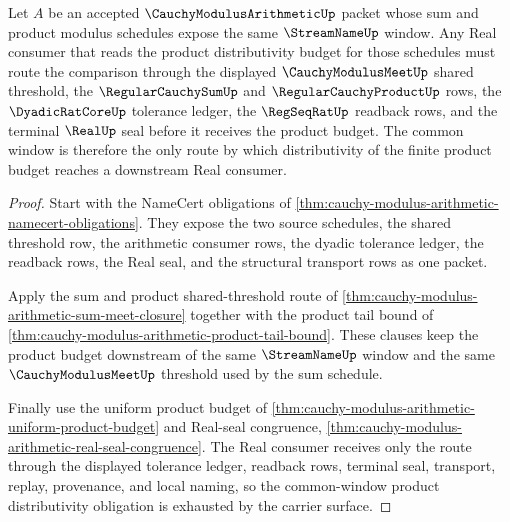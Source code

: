 \begin{theorem}
\label{thm:cauchy-modulus-arithmetic-windowed-product-distributivity}
Let $A$ be an accepted $\CauchyModulusArithmeticUp$ packet whose sum and
product modulus schedules expose the same $\StreamNameUp$ window. Any Real
consumer that reads the product distributivity budget for those schedules must
route the comparison through the displayed $\CauchyModulusMeetUp$ shared
threshold, the $\RegularCauchySumUp$ and $\RegularCauchyProductUp$ rows, the
$\DyadicRatCoreUp$ tolerance ledger, the $\RegSeqRatUp$ readback rows, and the
terminal $\RealUp$ seal before it receives the product budget. The common
window is therefore the only route by which distributivity of the finite
product budget reaches a downstream Real consumer.
\end{theorem}
\begin{proof}
Start with the NameCert obligations of
\autoref{thm:cauchy-modulus-arithmetic-namecert-obligations}. They expose the
two source schedules, the shared threshold row, the arithmetic consumer rows,
the dyadic tolerance ledger, the readback rows, the Real seal, and the
structural transport rows as one packet.

Apply the sum and product shared-threshold route of
\autoref{thm:cauchy-modulus-arithmetic-sum-meet-closure} together with the
product tail bound of
\autoref{thm:cauchy-modulus-arithmetic-product-tail-bound}. These clauses keep
the product budget downstream of the same $\StreamNameUp$ window and the same
$\CauchyModulusMeetUp$ threshold used by the sum schedule.

Finally use the uniform product budget of
\autoref{thm:cauchy-modulus-arithmetic-uniform-product-budget} and Real-seal
congruence,
\autoref{thm:cauchy-modulus-arithmetic-real-seal-congruence}. The Real
consumer receives only the route through the displayed tolerance ledger,
readback rows, terminal seal, transport, replay, provenance, and local naming,
so the common-window product distributivity obligation is exhausted by the
carrier surface.
\end{proof}

